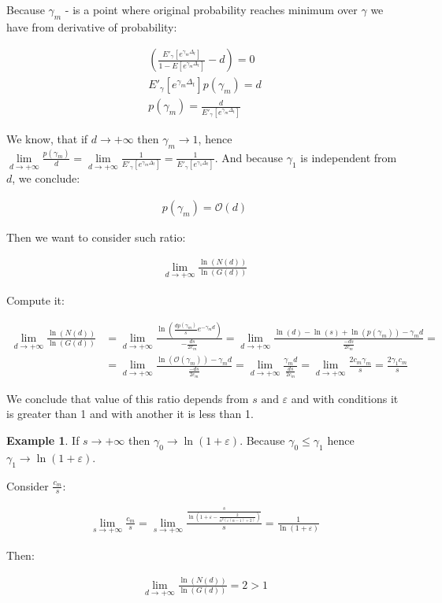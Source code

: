 \documentclass[12pt, a4paper]{article}
\theoremstyle{remark}
\theoremstyle{definition}
\newtheorem*{exmp}{Example}
\newcommand{\limd}{\lim\limits_{d \to +\infty}}
\begin{document}
Because \(\gamma_m\) - is a point where original probability reaches minimum over \(\gamma\) we have from derivative of probability:

\begin{gather*}
    \left(\frac{E'_\gamma [e^{\gamma_m \Delta_t}]}{1 - E[e^{\gamma_m \Delta_t}]} - d\right) = 0 \\
    E'_\gamma [e^{\gamma_m \Delta_t}] p(\gamma_m) = d \\
    p(\gamma_m) = \frac{d}{E'_\gamma [e^{\gamma_m \Delta_t}]}
\end{gather*}

We know, that if \(d \to +\infty\) then \(\gamma_m \to 1\), hence \(\lim\limits_{d \to +\infty} \frac{p(\gamma_m)}{d} = \lim\limits_{d \to +\infty} \frac{1}{E'_\gamma [e^{\gamma_m \Delta_t}]} = \frac{1}{E'_\gamma [e^{\gamma_1 \Delta_t}]} \). And because \(\gamma_1\) is independent from \(d\), we conclude:

\begin{align*}
    p(\gamma_m) = \mathcal{O} (d)
\end{align*}

Then we want to consider such ratio:

\begin{align*}
    \limd \frac{\ln(N(d))}{\ln(G(d))}
\end{align*}

Compute it:

\begin{align*}
    \limd \frac{\ln(N(d))}{\ln(G(d))} &= \limd \frac{\ln(\frac{d p(\gamma_m)}{s}  e^{-\gamma_m d})}{-\frac{d s}{2 c_m}} = \limd \frac{\ln(d) - \ln(s) + \ln(p(\gamma_m)) - \gamma_m d}{\frac{- d s}{2 c_m}} = \\
    &= \limd \frac{\ln(\mathcal{O}(\gamma_m)) - \gamma_m d}{\frac{- d s}{2 c_m}} = \limd \frac{\gamma_m d}{\frac{d s}{2 c_m}} = \limd \frac{2 c_m \gamma_m}{s} = \frac{2 \gamma_1 c_m}{s}
\end{align*}

We conclude that value of this ratio depends from \(s \text{ and } \varepsilon\) and with conditions it is greater than 1 and with another it is less than 1.

\begin{exmp}
    If \(s \to +\infty\) then \(\gamma_0 \to \ln(1 + \varepsilon)\). Because \(\gamma_0 \leq \gamma_1\) hence \(\gamma_1 \to \ln(1 + \varepsilon)\). 
    
    Consider \(\frac{c_m}{s}\):

    \begin{align*}
        \lim\limits_{s \to +\infty} \frac{c_m}{s} = \lim\limits_{s \to +\infty} \frac{\frac{s}{\ln\left(1 + \varepsilon - \frac{2}{\alpha^2(\varepsilon(\alpha - 1) + 2)}\right)}}{s} = \frac{1}{\ln(1 + \varepsilon)}
    \end{align*}

    Then:

    \begin{align*}
        \limd \frac{\ln(N(d))}{\ln(G(d))} = 2 > 1
    \end{align*}
\end{exmp}
\end{document}
